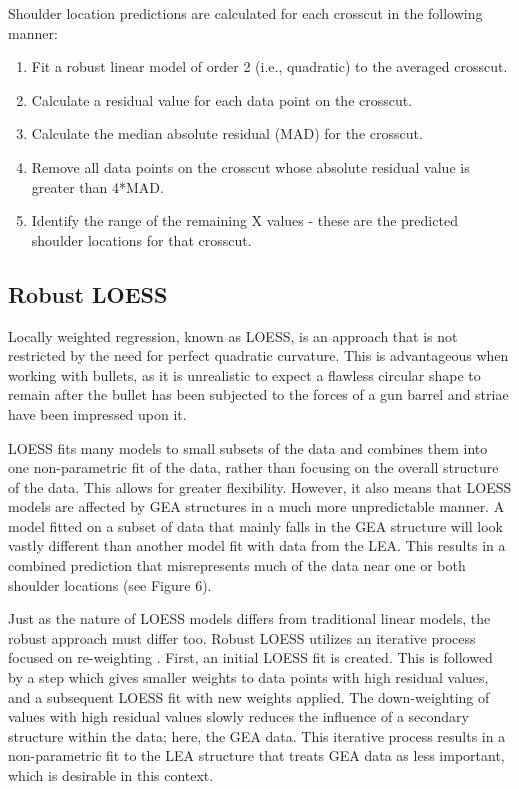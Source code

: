 \documentclass[]{article}
\begin{document}
Shoulder location predictions are calculated for each crosscut in the
following manner:\\

\begin{enumerate}
\item Fit a robust linear model of order 2 (i.e., quadratic) to the averaged crosscut.   
\item Calculate a residual value for each data point on the crosscut.  
\item Calculate the median absolute residual (MAD) for the crosscut.  
\item Remove all data points on the crosscut whose absolute residual value is greater than 4*MAD.  
\item Identify the range of the remaining X values - these are the predicted shoulder locations for that crosscut.   
\end{enumerate}

\subsection{Robust LOESS}

Locally weighted regression, known as LOESS, is an approach that is not
restricted by the need for perfect quadratic curvature. This is
advantageous when working with bullets, as it is unrealistic to expect a
flawless circular shape to remain after the bullet has been subjected to
the forces of a gun barrel and striae have been impressed upon it.

LOESS fits many models to small subsets of the data and combines them
into one non-parametric fit of the data, rather than focusing on the
overall structure of the data. This allows for greater flexibility.
However, it also means that LOESS models are affected by GEA structures
in a much more unpredictable manner. A model fitted on a subset of data
that mainly falls in the GEA structure will look vastly different than
another model fit with data from the LEA. This results in a combined
prediction that misrepresents much of the data near one or both shoulder
locations (see Figure 6).

Just as the nature of LOESS models differs from traditional linear
models, the robust approach must differ too. Robust LOESS utilizes an
iterative process focused on re-weighting \citep[see][]{Cleveland1}.
First, an initial LOESS fit is created. This is followed by a step which
gives smaller weights to data points with high residual values, and a
subsequent LOESS fit with new weights applied. The down-weighting of
values with high residual values slowly reduces the influence of a
secondary structure within the data; here, the GEA data. This iterative
process results in a non-parametric fit to the LEA structure that treats
GEA data as less important, which is desirable in this context.
\end{document}
